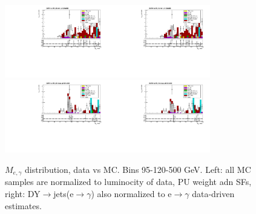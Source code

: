 \begin{figure}[htb]
\begin{center}
    \includegraphics[width=0.40\textwidth]{../figs/figs_v11/ELECTRON_WGamma/PrepareYields/c_TotalDATAvsMC_Barrel__Mpholep1PRELIMINARY_FOR_E_TO_GAMMA_WITH_PSV_CUT_pt120to500_.pdf}\includegraphics[width=0.40\textwidth]{../figs/figs_v11/ELECTRON_WGamma/PrepareYields/c_TotalDATAvsMC_Barrel__Mpholep1PRELIMINARY_FOR_E_TO_GAMMA_WITH_PSV_CUT_pt120to500__etogScale.pdf}\\
    \includegraphics[width=0.40\textwidth]{../figs/figs_v11/ELECTRON_WGamma/PrepareYields/c_TotalDATAvsMC_Endcap__Mpholep1PRELIMINARY_FOR_E_TO_GAMMA_WITH_PSV_CUT_pt120to500_.pdf}\includegraphics[width=0.40\textwidth]{../figs/figs_v11/ELECTRON_WGamma/PrepareYields/c_TotalDATAvsMC_Endcap__Mpholep1PRELIMINARY_FOR_E_TO_GAMMA_WITH_PSV_CUT_pt120to500__etogScale.pdf}\\
   \label{fig:Mpholep1DatavsMC_75to500}
  \caption{$M_{e,\gamma}$ distribution, data vs MC. Bins 95-120-500 GeV. Left: all MC samples are normalized to luminocity of data, PU weight adn SFs, right: DY$\rightarrow$jets(e$\rightarrow\gamma$) also normalized to e$\rightarrow\gamma$ data-driven estimates.}
  \end{center}
\end{figure}
